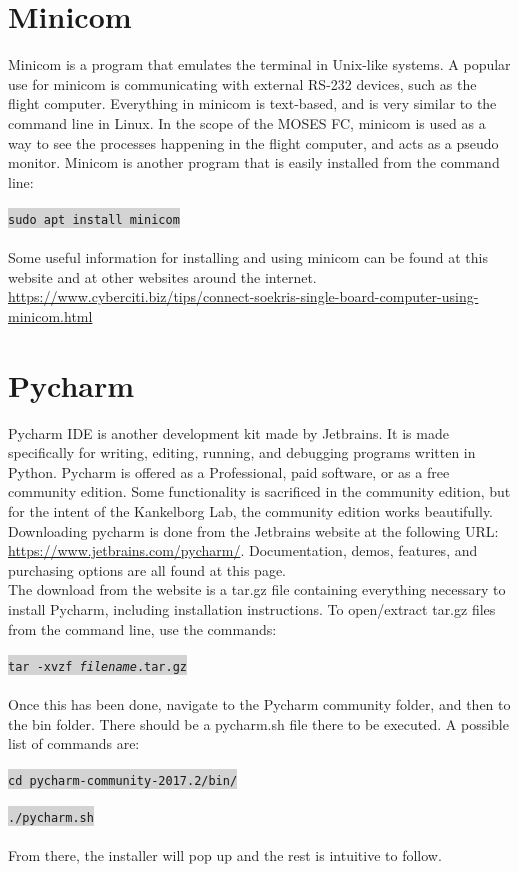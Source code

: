 \documentclass[11pt,a4paper,titlepage]{article}
\begin{document}
	 \section{Minicom}
	 Minicom is a program that emulates the terminal in Unix-like systems. A popular use for minicom is communicating with external RS-232 devices, such as the flight computer. Everything in minicom is text-based, and is very similar to the command line in Linux. In the scope of the MOSES FC, minicom is used as a way to see the processes happening in the flight computer, and acts as a pseudo monitor. Minicom is another program that is easily installed from the command line: \\
	 \\ 
	 \colorbox{lightgray}{\texttt{sudo apt install minicom}} \\
	 \\
	 Some useful information for installing and using minicom can be found at this website and at other websites around the internet. \\ \url{https://www.cyberciti.biz/tips/connect-soekris-single-board-computer-using-minicom.html}
	 
	 \section{Pycharm}
	 Pycharm IDE is another development kit made by Jetbrains. It is made specifically for writing, editing, running, and debugging programs written in Python. Pycharm is offered as a Professional, paid software, or as a free community edition. Some functionality is sacrificed in the community edition, but for the intent of the Kankelborg Lab, the community edition works beautifully. \\
	 Downloading pycharm is done from the Jetbrains website at the following URL: \url{https://www.jetbrains.com/pycharm/}. Documentation, demos, features, and purchasing options are all found at this page. \\
	 The download from the website is a tar.gz file containing everything necessary to install Pycharm, including installation instructions. To open/extract tar.gz files from the command line, use the commands: \\
	 \\
	 \colorbox{lightgray}{\texttt{tar -xvzf \textit{filename}.tar.gz}} \\
	 \\
	 Once this has been done, navigate to the Pycharm community folder, and then to the bin folder. There should be a pycharm.sh file there to be executed. A possible list of commands are: \\
	 \\
	 \colorbox{lightgray}{\texttt{cd pycharm-community-2017.2/bin/}} \\
	 \\
	 \colorbox{lightgray}{\texttt{./pycharm.sh}} \\
	 \\
	 From there, the installer will pop up and the rest is intuitive to follow.
	 
\end{document}
